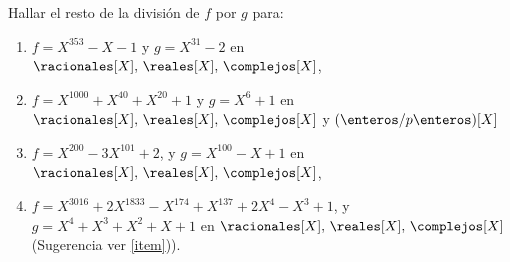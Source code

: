 \ejercicio

Hallar el resto de la división de $f$ por $g$ para:

\begin{enumerate}[label=\roman*)]
	\item $f = X^{353} - X - 1$ y $g = X^{31} - 2$ en $\racionales[X],\,\reales[X],\,\complejos[X]$,

	\item $f = X^{1000} + X^{40} + X^{20}  + 1$ y $g = X^6 + 1$ en $\racionales[X],\,\reales[X],\,\complejos[X]$ y $(\enteros/p\enteros)[X]$

	\item $f = X^{200} - 3X^{101} + 2$, y $g = X^{100} - X + 1$ en $\racionales[X],\,\reales[X],\,\complejos[X]$,

	\item $f = X^{3016} + 2X^{1833} - X^{174} + X^{137} + 2X^4 - X^3 + 1$, y $g = X^4 + X^3 +X^2 + X + 1$ en $\racionales[X],\,\reales[X],\,\complejos[X]$
	      (Sugerencia ver  \ref{item})).
\end{enumerate}

\separadorCorto

